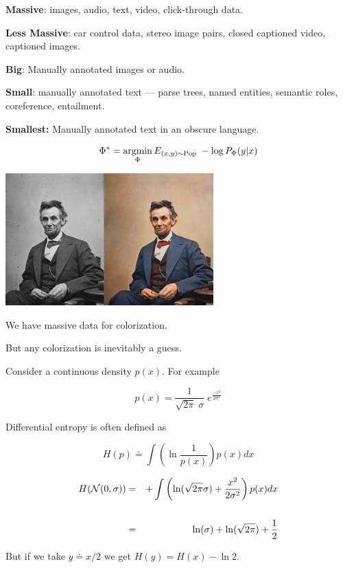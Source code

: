 {\vfill
{\bf Massive}: images, audio, text, video, click-through data.

\vfill
{\bf Less Massive}: car control data, stereo image pairs, closed captioned video, captioned images.

\vfill
{\bf Big}: Manually annotated images or audio.

\vfill
{\bf Small}: manually annotated text --- parse trees, named entities, semantic roles, coreference, entailment.

\vfill
{\bf Smallest:} Manually annotated text in an obscure language.


$$\Phi^* = \operatorname*{argmin}_\Phi E_{(x,y) \sim \mathrm{Pop}}\;-\log P_\Phi(y|x)$$

\vfill
\centerline{\includegraphics[height=2in]{../images/Colorization}}

\vfill
We have massive data for colorization.

\vfill
But any colorization is inevitably a guess.


Consider a continuous density $p(x)$.  For example

\vfill
$$p(x) = \frac{1}{\sqrt{2\pi}\; \sigma}\; e^{\frac{-x^2}{2\sigma^2}}$$

\vfill
Differential entropy is often defined as

\vfill
$$H(p) \doteq \int \left(\ln \frac{1}{p(x)}\right) p(x) dx$$


\begin{eqnarray*}
  H({\cal N}(0,\sigma)) & = &  + \int \left( \ln(\sqrt{2\pi} \sigma) + \frac{x^2}{2\sigma^2}\right) p(x) dx \\
  \\
  & = & \ln(\sigma) + \ln(\sqrt{2\pi}) + \frac{1}{2}
\end{eqnarray*}

\vfill
But if we take $y \doteq x/2$ we get $H(y) = H(x) - \ln 2$.

}
